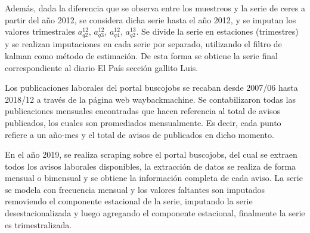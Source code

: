 \begin{table*}
	
	\caption{\label{tab:}Tabla de avisos laborales}
	\centering
\end{table*}

Además, dada la diferencia que se observa entre los muestreos y la serie de ceres a partir del año 2012, se considera dicha serie hasta el año 2012, y se imputan los valores trimestrales $a_{q2}^{12}$, $a_{q3}^{12}$, $a_{q4}^{12}$, $a_{q2}^{13}$. Se divide la serie en estaciones (trimestres) y se realizan imputaciones en cada serie por separado, utilizando el filtro de kalman como método de estimación. De esta forma se obtiene la serie final correspondiente al diario El País sección gallito Luis.


Los publicaciones laborales del portal buscojobs se recaban desde 2007/06 hasta 2018/12 a través de la página web waybackmachine. Se contabilizaron todas las publicaciones mensuales encontradas que hacen referencia al total de avisos publicados, los cuales son promediados mensualmente. Es decir, cada punto refiere a un año-mes y el total de avisos de publicados en dicho momento.

En el año 2019, se realiza scraping sobre el portal buscojobs, del cual se extraen todos los avisos laborales disponibles, la extracción de datos se realiza de forma mensual o bimensual y se obtiene la información completa de cada aviso.
La serie se modela con frecuencia mensual y los valores faltantes son imputados removiendo el componente estacional de la serie, imputando la serie desestacionalizada y luego agregando el componente estacional, finalmente la serie es trimestralizada.


